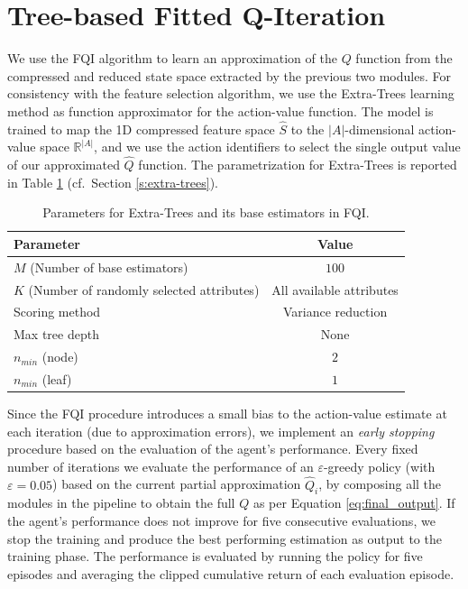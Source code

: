 \section{Tree-based Fitted Q-Iteration}
We use the FQI algorithm to learn an approximation of the $Q$ function from the
compressed and reduced state space extracted by the previous two modules. 
For consistency with the feature selection algorithm, we use the Extra-Trees 
learning method as function approximator for the action-value function.
The model is trained to map the 1D compressed feature space $\hat{S}$ to the 
$|A|$-dimensional action-value space $\mathbb{R}^{|A|}$, and we use the action 
identifiers to select the single output value of our approximated $\hat{Q}$ 
function. 
The parametrization for Extra-Trees is reported in Table \ref{t:FQI_tree_params}
(cf.\ Section \ref{s:extra-trees}).
%
\begin{table}	
    \centering
    \begin{tabular}{l c} 
	\hline
	Parameter                                    & Value                    \\ 
	\hline 
	$M$ (Number of base estimators)              & $100$                    \\
	$K$ (Number of randomly selected attributes) & All available attributes \\
	\hline
	Scoring method                               & Variance reduction       \\
	Max tree depth                               & None                     \\
	$n_{min}$ (node)                             & $2$                      \\
	$n_{min}$ (leaf)                             & $1$                      \\
	\hline
    \end{tabular}
    \caption[Parameters for Extra-Trees (FQI)]{Parameters for Extra-Trees and
	    its base estimators in FQI.}
    \label{t:FQI_tree_params}
\end{table}
%

Since the FQI procedure introduces a small bias to the action-value estimate at 
each iteration (due to approximation errors), we implement an \textit{early 
stopping} procedure based on the evaluation of the agent's performance.
Every fixed number of iterations we evaluate the performance of an 
$\varepsilon$-greedy policy (with $\varepsilon = 0.05$) based on the current 
partial approximation $\hat{Q}_i$, by composing all the modules in the pipeline 
to obtain the full $Q$ as per Equation \eqref{eq:final_output}. 
If the agent's performance does not improve for five consecutive evaluations, we 
stop the training and produce the best performing estimation as output to the 
training phase.
The performance is evaluated by running the policy for five episodes and 
averaging the clipped cumulative return of each evaluation episode. 

